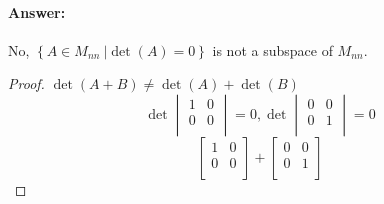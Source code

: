 \documentclass[12pt]{article}
\begin{document}
\begin{enumerate}
\begin{enumerate}
                            \paragraph{Answer:} No, ${ \left\{A \in M_{nn} \
                                                    | \det (A) = 0 \right\}}$ is not a subspace of $M_{nn}$.
                            \begin{proof}
                                    $\det(A+B) \neq \det (A)+\det (B)$
                                    \begin{equation*}
                                            \det
                                            \begin{vmatrix}
                                                    {1} & {0} \\
                                                    {0} & {0} \\
                                            \end{vmatrix}
                                            {= 0},
                                            \det
                                            \begin{vmatrix}
                                                    {0} & {0} \\
                                                    {0} & {1} \\
                                            \end{vmatrix}
                                            = 0
                                    \end{equation*}
                                    \begin{equation*}
                                            \begin{bmatrix}
                                                    {1} & {0} \\
                                                    {0} & {0} \\
                                            \end{bmatrix}
                                            +
                                            \begin{bmatrix}
                                                    {0} & {0} \\
                                                    {0} & {1} \\
                                            \end{bmatrix}

\end{equation*}
\end{proof}
\end{enumerate}
\end{enumerate}
\end{document}
